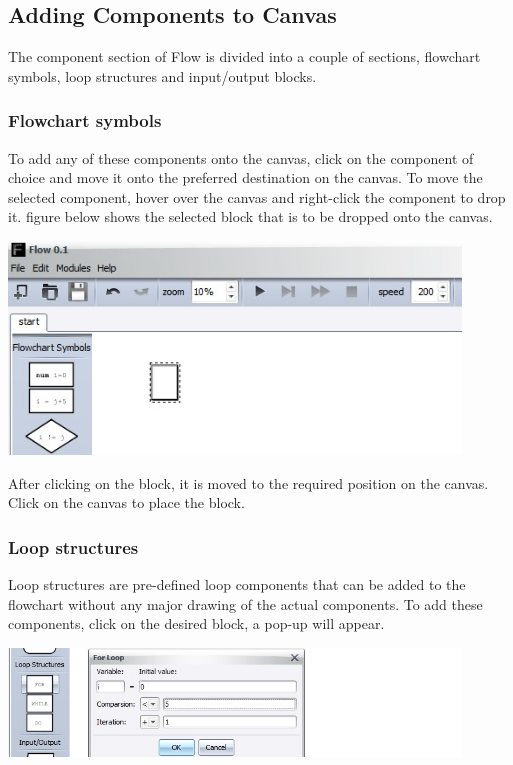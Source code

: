 \documentclass[11pt,a4paper,titlepage]{article}
\begin{document}
		
	\subsection{Adding Components to Canvas}
	
	The component section of Flow is divided into a couple of sections, flowchart symbols, loop structures and input/output blocks.
	\subsubsection{Flowchart symbols}
	
	To add any of these components onto the canvas, click on the component of choice and move it onto the preferred destination on the canvas. To move the selected component, hover over the canvas and right-click the component to drop it. figure below shows the selected block that is to be dropped onto the canvas.\newline
	
	\includegraphics[width=12cm]{images/addBlock.jpg} \newline
	
	After clicking on the block, it is moved to the required position on the canvas. Click on the canvas to place the block.
	
	
	
	\subsubsection{Loop structures}
	
	Loop structures are pre-defined loop components that can be added to the flowchart without any major drawing of the actual components. To add these components, click on the desired block, a pop-up will appear.\newline \newline
	
	\includegraphics[width=12cm]{images/loops.jpg} \newline
	
\end{document}

